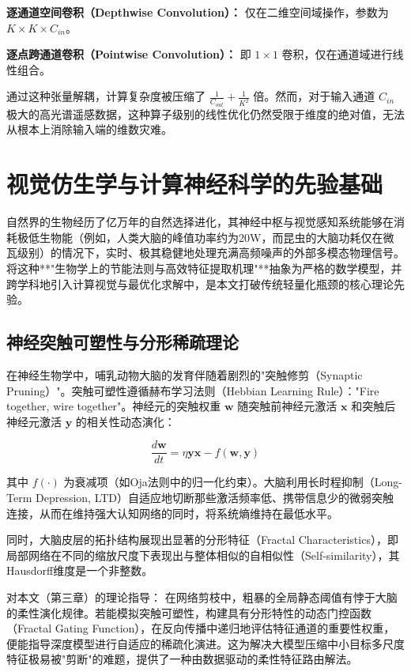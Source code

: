 \textbf{逐通道空间卷积（Depthwise Convolution）：} 仅在二维空间域操作，参数为 $K \times K \times C_{in}$。

\textbf{逐点跨通道卷积（Pointwise Convolution）：} 即 $1 \times 1$ 卷积，仅在通道域进行线性组合。

通过这种张量解耦，计算复杂度被压缩了 $\frac{1}{C_{out}} + \frac{1}{K^2}$ 倍。然而，对于输入通道 $C_{in}$ 极大的高光谱遥感数据，这种算子级别的线性优化仍然受限于维度的绝对值，无法从根本上消除输入端的维数灾难。

\section{视觉仿生学与计算神经科学的先验基础}

自然界的生物经历了亿万年的自然选择进化，其神经中枢与视觉感知系统能够在消耗极低生物能（例如，人类大脑的峰值功率约为20W，而昆虫的大脑功耗仅在微瓦级别）的情况下，实时、极其稳健地处理充满高频噪声的外部多模态物理信号。将这种**"生物学上的节能法则与高效特征提取机理"**抽象为严格的数学模型，并跨学科地引入计算视觉与最优化求解中，是本文打破传统轻量化瓶颈的核心理论先验。

\subsection{神经突触可塑性与分形稀疏理论}

在神经生物学中，哺乳动物大脑的发育伴随着剧烈的"突触修剪（Synaptic Pruning）"。突触可塑性遵循赫布学习法则（Hebbian Learning Rule）："Fire together, wire together"。神经元的突触权重 $\mathbf{w}$ 随突触前神经元激活 $\mathbf{x}$ 和突触后神经元激活 $\mathbf{y}$ 的相关性动态演化：

\begin{equation}
\frac{d\mathbf{w}}{dt} = \eta \mathbf{y} \mathbf{x} - f(\mathbf{w}, \mathbf{y})
\end{equation}

其中 $f(\cdot)$ 为衰减项（如Oja法则中的归一化约束）。大脑利用长时程抑制（Long-Term Depression, LTD）自适应地切断那些激活频率低、携带信息少的微弱突触连接，从而在维持强大认知网络的同时，将系统熵维持在最低水平。

同时，大脑皮层的拓扑结构展现出显著的分形特征（Fractal Characteristics），即局部网络在不同的缩放尺度下表现出与整体相似的自相似性（Self-similarity），其Hausdorff维度是一个非整数。

对本文（第三章）的理论指导： 在网络剪枝中，粗暴的全局静态阈值有悖于大脑的柔性演化规律。若能模拟突触可塑性，构建具有分形特性的动态门控函数（Fractal Gating Function），在反向传播中递归地评估特征通道的重要性权重，便能指导深度模型进行自适应的稀疏化演进。这为解决大模型压缩中小目标多尺度特征极易被"剪断"的难题，提供了一种由数据驱动的柔性特征路由解法。

